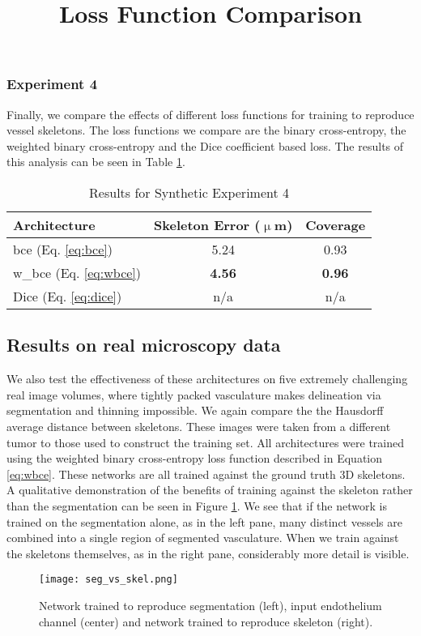 \documentclass[journal,transmag]{IEEEtran}
\begin{document}
\subsubsection*{Experiment 4}
Finally, we compare the effects of different loss functions for training to reproduce vessel skeletons. The loss functions we compare are the binary cross-entropy, the weighted binary cross-entropy and the Dice coefficient based loss. The results of this analysis can be seen in Table \ref{tab:loss_func}.
\begin{table}[h]
\title{Loss Function Comparison}
\centering
\begin{tabular}{l|c|c}
Architecture & Skeleton Error ($\upmu$m)  & Coverage \\
\hline
bce (Eq. \ref{eq:bce}) & 5.24 & 0.93 \\
w\_bce (Eq. \ref{eq:wbce}) & \textbf{4.56}  & \textbf{0.96} \\
Dice (Eq. \ref{eq:dice}) & n/a  & n/a \\
\end{tabular}
\caption{Results for Synthetic Experiment 4}
\label{tab:loss_func}
\end{table}



\subsection{Results on real microscopy data}

We also test the effectiveness of these architectures on five extremely challenging real image volumes, where tightly packed vasculature makes delineation via segmentation and thinning impossible. We again compare the the Hausdorff average distance between skeletons. These images were taken from a different tumor to those used to construct the training set. All architectures were trained using the weighted binary cross-entropy loss function described in Equation \ref{eq:wbce}. These networks are all trained against the ground truth 3D skeletons. A qualitative demonstration of the benefits of training against the skeleton rather than the segmentation can be seen in Figure \ref{fig:seg_skel_compare}. We see that if the network is trained on the segmentation alone, as in the left pane, many distinct vessels are combined into a single region of segmented vasculature. When we train against the skeletons themselves, as in the right pane, considerably more detail is visible.

\begin{figure}
\centering
\texttt{[image: seg\_vs\_skel.png]}
\caption{Network trained to reproduce segmentation (left), input endothelium channel (center) and network trained to reproduce skeleton (right).}
\label{fig:seg_skel_compare}
\end{figure}
\end{document}
